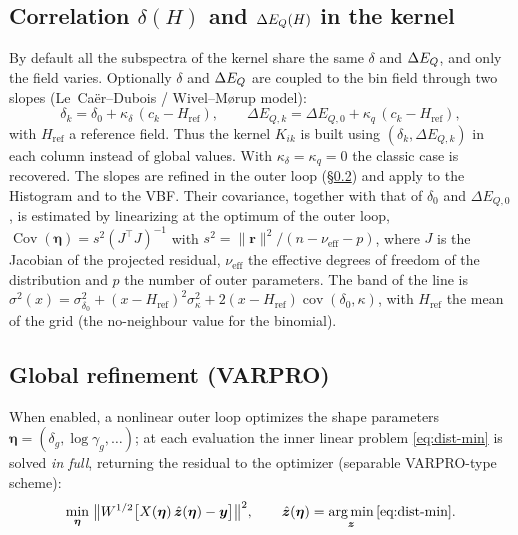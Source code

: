 \subsection{Correlation \texorpdfstring{$\delta(H)$}{d(H)} and \texorpdfstring{$\Delta E_{Q}(H)$}{DEQ(H)} in the kernel}\label{sec:dist-corr}
By default all the subspectra of the kernel share the same $\delta$ and $\Delta E_{Q}$, and
only the field varies. Optionally $\delta$ and $\Delta E_{Q}$ are coupled to the bin field
through two slopes (Le~Caër--Dubois / Wivel--M\o{}rup model):
\begin{equation}
  \delta_k = \delta_0 + \kappa_\delta\,(c_k-H_{\text{ref}}),\qquad
  \Delta E_{Q,k} = \Delta E_{Q,0} + \kappa_q\,(c_k-H_{\text{ref}}),
\end{equation}
with $H_{\text{ref}}$ a reference field. Thus the kernel $K_{ik}$ is built using
$(\delta_k,\Delta E_{Q,k})$ in each column instead of global values. With
$\kappa_\delta=\kappa_q=0$ the classic case is recovered. The slopes are refined in
the outer loop (\S\ref{sec:refine}) and apply to the Histogram and to the VBF.
Their covariance, together with that of $\delta_0$ and $\Delta E_{Q,0}$, is
estimated by linearizing at the optimum of the outer loop,
$\operatorname{Cov}(\bm\eta)=s^2(J^\top J)^{-1}$ with
$s^2=\|\bm r\|^2/(n-\nu_{\text{eff}}-p)$, where $J$ is the Jacobian of the
projected residual, $\nu_{\text{eff}}$ the effective degrees of freedom of the
distribution and $p$ the number of outer parameters. The band of the line is
$\sigma^2(x)=\sigma^2_{\delta_0}+(x-H_{\text{ref}})^2\sigma^2_{\kappa}
+2(x-H_{\text{ref}})\operatorname{cov}(\delta_0,\kappa)$, with
$H_{\text{ref}}$ the mean of the grid (the no-neighbour value for the binomial).

\subsection{Global refinement (VARPRO)}\label{sec:refine}
When enabled, a nonlinear outer loop optimizes the shape parameters
$\bm\eta=(\delta_g,\log\gamma_g,\dots)$; at each evaluation the inner linear problem
\eqref{eq:dist-min} is solved \emph{in full}, returning the residual to the
optimizer (separable VARPRO-type scheme):
\begin{equation}
  \min_{\bm\eta}\;\bigl\|W^{1/2}\bigl[X(\bm\eta)\,\hat{\bm z}(\bm\eta)-\bm y\bigr]\bigr\|^2,
  \qquad \hat{\bm z}(\bm\eta)=\operatorname*{arg\,min}_{\bm z}\eqref{eq:dist-min}.
\end{equation}

